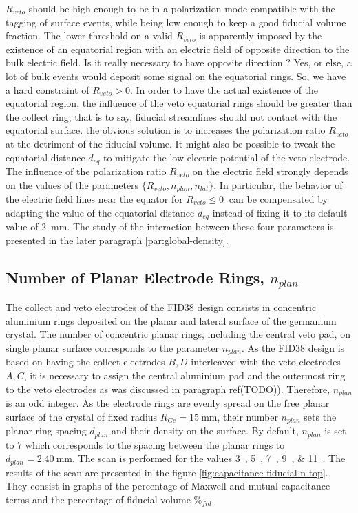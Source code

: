 $R_{veto}$ should be high enough to be in a polarization mode compatible with the tagging of surface events, while being low enough to keep a good fiducial volume fraction.
The lower threshold on a valid $R_{veto}$ is apparently imposed by the existence of an equatorial region with an electric field of opposite direction to the bulk electric field. Is it really necessary to have opposite direction ? Yes, or else, a lot of bulk events would deposit some signal on the equatorial rings. So, we have a hard constraint of $R_{veto} > 0$. In order to have the actual existence of the equatorial region, the influence of the veto equatorial rings should be greater than the collect ring, that is to say, fiducial streamlines should not contact with the equatorial surface. the obvious solution is to increases the polarization ratio $R_{veto}$ at the detriment of the fiducial volume.
It might also be possible to tweak the equatorial distance $d_{eq}$ to mitigate the low electric potential of the veto electrode.
The influence of the polarization ratio $R_{veto}$ on the electric field strongly depends on the values of the parameters $\{R_{veto}, n_{plan}, n_{lat} \}$. In particular, the behavior of the electric field lines near the equator for $R_{veto} \leq \SI{0}{}$ can be compensated by adapting the value of the equatorial distance $d_{eq}$ instead of fixing it to its default value of \SI{2}{\mm}. The study of the interaction between these four parameters is presented in the later paragraph \ref{par:global-density}.

\subsection{Number of Planar Electrode Rings, $n_{plan}$}
\label{par:n-plan}

The collect and veto electrodes of the FID38 design consists in concentric aluminium rings deposited on the planar and lateral surface of the germanium crystal. The number of concentric planar rings, including the central veto pad, on single planar surface corresponds to the parameter $n_{plan}$.
As the FID38 design is based on having the collect electrodes $B,D$ interleaved with the veto electrodes $A,C$, it is necessary to assign the central aluminium pad and the outermost ring to the veto electrodes as was discussed in paragraph ref(TODO)). Therefore, $n_{plan}$ is an odd integer. As the electrode rings are evenly spread on the free planar surface of the crystal of fixed radius $R_{Ge}=\SI{15}{\mm}$, their number $n_{plan}$ sets the planar ring spacing $d_{plan}$ and their density on the surface.
By default, $n_{plan}$ is set to $7$ which corresponds to the spacing between the planar rings to $d_{plan}=\SI{2.40}{\mm}$.  The scan is performed for the values \SIlist{3;5;7;9;11}{}. The results of the scan are presented in the figure \ref{fig:capacitance-fiducial-n-top}. They consist in graphs of the percentage of Maxwell and mutual capacitance terms and the percentage of fiducial volume $\%_{fid}$.

